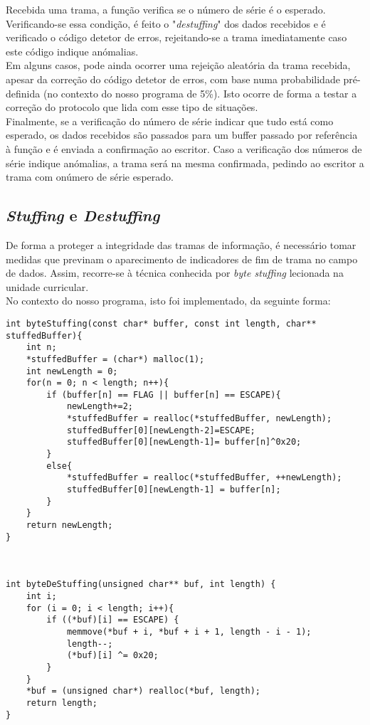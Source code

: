 \documentclass{article}
\begin{document}
Recebida uma trama, a função verifica se o número de série é o esperado.\\
Verificando-se essa condição, é feito o "\textit{destuffing}" dos dados recebidos e é verificado o código detetor de erros, rejeitando-se a trama imediatamente caso este código indique anómalias.\\
Em alguns casos, pode ainda ocorrer uma rejeição aleatória da trama recebida, apesar da correção do código detetor de erros, com base numa probabilidade pré-definida (no contexto do nosso programa de 5\%). Isto ocorre de forma a testar a correção do protocolo que lida com esse tipo de situações.\\
Finalmente, se a verificação do número de série indicar que tudo está como esperado, os dados recebidos são passados para um buffer passado por referência à função e é enviada a confirmação ao escritor. Caso a verificação dos números de série indique anómalias, a trama será na mesma confirmada, pedindo ao escritor a trama com onúmero de série esperado.

\subsection{\textit{Stuffing} e \textit{Destuffing}}
De forma a proteger a integridade das tramas de informação, é necessário tomar medidas que previnam o aparecimento de indicadores de fim de trama no campo de dados. Assim, recorre-se à técnica conhecida por \textit{byte stuffing} lecionada na unidade curricular.\\

No contexto do nosso programa, isto foi implementado, da seguinte forma:

\begin{lstlisting}
int byteStuffing(const char* buffer, const int length, char** stuffedBuffer){
	int n;
	*stuffedBuffer = (char*) malloc(1);
	int newLength = 0;
	for(n = 0; n < length; n++){
		if (buffer[n] == FLAG || buffer[n] == ESCAPE){
			newLength+=2;
			*stuffedBuffer = realloc(*stuffedBuffer, newLength);
			stuffedBuffer[0][newLength-2]=ESCAPE;
			stuffedBuffer[0][newLength-1]= buffer[n]^0x20;
		}
		else{
			*stuffedBuffer = realloc(*stuffedBuffer, ++newLength);
			stuffedBuffer[0][newLength-1] = buffer[n];
		}
	}
	return newLength;
}



int byteDeStuffing(unsigned char** buf, int length) {
	int i;
	for (i = 0; i < length; i++){
		if ((*buf)[i] == ESCAPE) {
			memmove(*buf + i, *buf + i + 1, length - i - 1);
			length--;
			(*buf)[i] ^= 0x20;
		}
	}
	*buf = (unsigned char*) realloc(*buf, length);
	return length;
}
\end{lstlisting}
\end{document}
